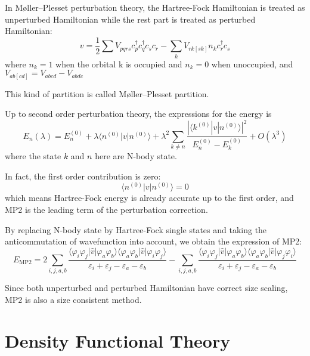 In M{\o}ller–Plesset perturbation theory, the Hartree-Fock Hamiltonian is treated as unperturbed Hamiltonian while the rest part is treated as perturbed Hamiltonian:
\begin{equation}
v=\frac{1}{2} \sum V_{p q r s} c_{p}^{\dagger} c_{q}^{\dagger} c_{s} c_{r}-\sum_{k} V_{r k[s k]} n_{k} c_{r}^{\dagger} c_{s}
\end{equation}
where $n_k=1$ when the orbital k is occupied and $n_k=0$ when unoccupied, and $V_{ab[cd]}=V_{abcd}-V_{abdc}$

This kind of partition is called M{\o}ller–Plesset partition.

Up to second order perturbation theory, the expressions for the energy is
\begin{equation}
E_{n}(\lambda)=E_{n}^{(0)}+\lambda\langle n^{(0)}|v| n^{(0)}\rangle+\lambda^{2} \sum_{k \neq n} \frac{|\langle k^{(0)}|v| n^{(0)}\rangle|^{2}}{E_{n}^{(0)}-E_{k}^{(0)}}+O\left(\lambda^{3}\right)
\end{equation}
where the state $k$ and $n$ here are N-body state.

In fact, the first order contribution is zero:
\begin{equation}
\langle n^{(0)}|v| n^{(0)}\rangle=0
\end{equation}
which means Hartree-Fock energy is already accurate up to the first order, and MP2 is the leading term of the perturbation correction.

By replacing N-body state by Hartree-Fock single states and taking the anticommutation of wavefunction into account, we obtain the expression of MP2:
\begin{equation}
E_{\mathrm{MP} 2}=2 \sum_{i, j, a, b} \frac{\langle\varphi_{i} \varphi_{j}|\hat{v}| \varphi_{a} \varphi_{b}\rangle\langle\varphi_{a} \varphi_{b}|\hat{v}| \varphi_{i} \varphi_{j}\rangle}{\varepsilon_{i}+\varepsilon_{j}-\varepsilon_{a}-\varepsilon_{b}}-\sum_{i, j, a, b} \frac{\langle\varphi_{i} \varphi_{j}|\hat{v}| \varphi_{a} \varphi_{b}\rangle\langle\varphi_{a} \varphi_{b}|\hat{v}| \varphi_{j} \varphi_{i}\rangle}{\varepsilon_{i}+\varepsilon_{j}-\varepsilon_{a}-\varepsilon_{b}}
\end{equation}

Since both unperturbed and perturbed Hamiltonian have correct size scaling, MP2 is also a size consistent method.

\section{Density Functional Theory}


